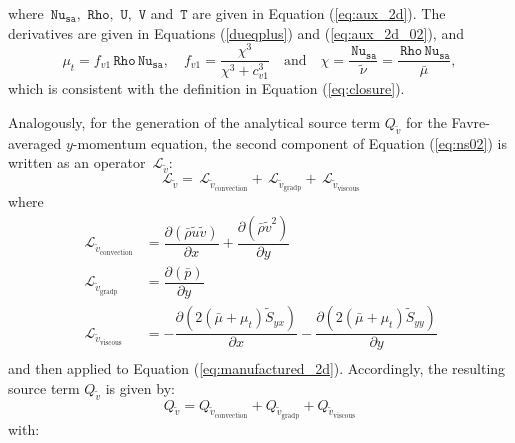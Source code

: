 \documentclass[10pt]{article}
\newcommand{\Diff}[2] {\dfrac{\partial\left( #1\right)}{\partial #2}}
\newcommand{\Rho}{\,\mathtt{Rho}}
\newcommand{\U}{\,\mathtt{U}}
\newcommand{\V}{\,\mathtt{V}}
\newcommand{\Nu}{\,\mathtt{Nu_{sa}}}
\newcommand{\T}{\,\mathtt{T}}
\newcommand{\Lo}{\,\mathcal{L}}
\newcommand{\brho}{\bar{\rho}}
\newcommand{\bp}{\bar{p}}
\newcommand{\tu}{\tilde{u}}
\newcommand{\tv}{\tilde{v}}
\newcommand{\tS}{\tilde{S}}
\newcommand{\bmu}{\bar{\mu}}
\begin{document}
where  $\Nu,\, \Rho,\,\U,\,\V$ and $\T$ are given in Equation (\ref{eq:aux_2d}). The derivatives are given in Equations (\ref{dueqplus}) and (\ref{eq:aux_2d_02}), and
\begin{equation}\label{eq:mu_t}
  \mu_t= f_{v1} \Rho \Nu,\quad f_{v1} = \dfrac{\chi^3}{\chi^3+c_{v1}^3}\quad \mbox{and}\quad \chi =\dfrac{\Nu}{\tilde{\nu}} =\dfrac{\Rho \Nu}{\bmu},
\end{equation}
which is consistent with the definition in Equation (\ref{eq:closure}).



Analogously, for the generation of the analytical source term $Q_{\tv}$ for the Favre-averaged $y$-momentum equation, the second component of Equation  (\ref{eq:ns02})  is written as an  operator $\Lo_{\tv}$:
\begin{equation*}
 \Lo_{\tv}= \Lo_{\tv_\text{convection}} + \Lo_{\tv_\text{gradp}}+\Lo_{\tv_\text{viscous}}
\end{equation*}
where
\begin{equation}
\begin{split}\label{eq:v_operators}
\Lo_{\tv_\text{convection}}&=  \Diff{\brho \tu\tv}{x}+\Diff{\brho \tv^2}{y} \\
\Lo_{\tv_\text{gradp}}&= \Diff{\bp}{y} \\
\Lo_{\tv_\text{viscous}}&=-\Diff{2(\bmu+\mu_t)\tS_{yx}}{x}-\Diff{2(\bmu+\mu_t)\tS_{yy}}{y}\\
\end{split}
\end{equation}
and then applied to Equation  (\ref{eq:manufactured_2d}). Accordingly, the resulting source term $Q_{\tv}$ is given by:
\begin{equation*}
Q_{\tv}	=Q_{\tv_\text{convection}} + Q_{\tv_\text{gradp}}+Q_{\tv_\text{viscous}}
\end{equation*}
with: 
\end{document}
